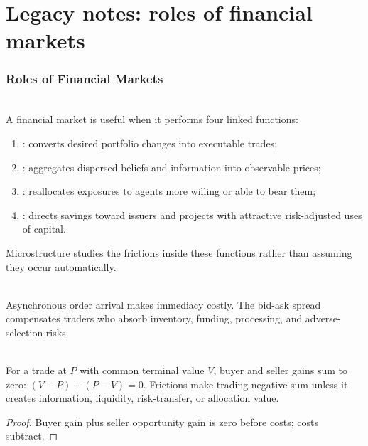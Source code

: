 \documentclass[a4paper,oneside,openany]{book}
\begin{document}
\chapter*{Legacy notes: roles of financial markets}

\subsection*{Roles of Financial Markets}

\begin{principle} \\
A financial market is useful when it performs four linked functions:
\begin{enumerate}[label=\roman*.]
\setlength{\itemsep}{0pt}
\item {}: converts desired portfolio changes into executable trades;
\item {}: aggregates dispersed beliefs and information into observable prices;
\item {}: reallocates exposures to agents more willing or able to bear them;
\item {}: directs savings toward issuers and projects with attractive risk-adjusted uses of capital.
\end{enumerate}
Microstructure studies the frictions inside these functions rather than assuming they occur automatically.
\end{principle}

\begin{principle} \\
Asynchronous order arrival makes immediacy costly. The bid-ask spread compensates traders who absorb inventory, funding, processing, and adverse-selection risks.
\end{principle}

\begin{proposition} \\
For a trade at $P$ with common terminal value $V$, buyer and seller gains sum to zero: $(V-P)+(P-V)=0$. Frictions make trading negative-sum unless it creates information, liquidity, risk-transfer, or allocation value.
\begin{proof}
Buyer gain plus seller opportunity gain is zero before costs; costs subtract.
\end{proof}
\end{proposition}
\end{document}

